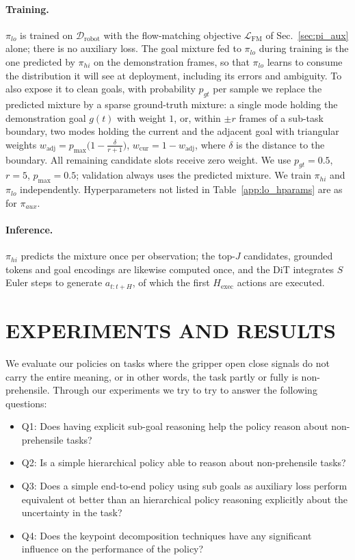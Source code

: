\documentclass[letterpaper, 10 pt, conference]{ieeeconf}  %
\begin{document}
\paragraph{\textbf{Training.}}
$\pi_{lo}$ is trained on $\mathcal{D}_{\text{robot}}$ with the flow-matching objective $\mathcal{L}_{\text{FM}}$ of Sec.~\ref{sec:pi_aux} alone; there is no auxiliary loss. The goal mixture fed to $\pi_{lo}$ during training is the one predicted by $\pi_{hi}$ on the demonstration frames, so that $\pi_{lo}$ learns to consume the distribution it will see at deployment, including its errors and ambiguity. To also expose it to clean goals, with probability $p_{gt}$ per sample we replace the predicted mixture by a sparse ground-truth mixture: a single mode holding the demonstration goal $g(t)$ with weight $1$, or, within $\pm r$ frames of a sub-task boundary, two modes holding the current and the adjacent goal with triangular weights $w_{\text{adj}}=p_{\max}\big(1-\tfrac{\delta}{r+1}\big)$, $w_{\text{cur}}=1-w_{\text{adj}}$, where $\delta$ is the distance to the boundary. All remaining candidate slots receive zero weight. We use $p_{gt}=0.5$, $r=5$, $p_{\max}=0.5$; validation always uses the predicted mixture. We train $\pi_{hi}$ and $\pi_{lo}$ independently. Hyperparameters not listed in Table~\ref{app:lo_hparams} are as for $\pi_{aux}$.

\paragraph{\textbf{Inference.}}
$\pi_{hi}$ predicts the mixture once per observation; the top-$J$ candidates,
grounded tokens and goal encodings are likewise computed once, and the DiT
integrates $S$ Euler steps to generate $a_{t:t+H}$, of which the first $H_{\text{exec}}$ actions are executed.

\section{EXPERIMENTS AND RESULTS}

We evaluate our policies on tasks where the gripper open close signals do not carry the entire meaning, or in other words, the task partly or fully is non-prehensile. Through our experiments we try to try to answer the following questions: 
\begin{itemize}
    \item Q1: Does having explicit sub-goal reasoning help the policy reason about non-prehensile tasks? 
    \item Q2: Is a simple hierarchical policy able to reason about non-prehensile tasks? 
    \item Q3: Does a simple end-to-end policy using sub goals as auxiliary loss perform equivalent ot better than an hierarchical policy reasoning explicitly about the uncertainty in the task? 
    \item Q4: Does the keypoint decomposition techniques have any significant influence on the performance of the policy? 
\end{itemize}
\end{document}

